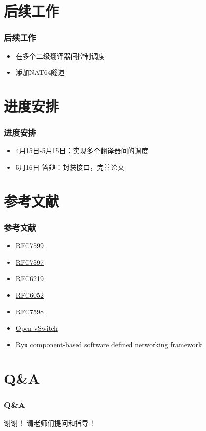 \documentclass{beamer}
\begin{document}
\section{后续工作}
\begin{frame}
  \frametitle{后续工作}

  \begin{block}{}
    \begin{itemize}
    \item 在多个二级翻译器间控制调度
    \item 添加NAT64隧道
    \end{itemize}
  \end{block}
\end{frame}

\section{进度安排}

\begin{frame}
  \frametitle{进度安排}
  \begin{block}{}
    \begin{itemize}
    \item 4月15日-5月15日：实现多个翻译器间的调度
    \item 5月16日-答辩：封装接口，完善论文
    \end{itemize}
  \end{block}
\end{frame}

\section{参考文献}
\begin{frame}
  \frametitle{参考文献}
  \begin{itemize}
  \item \href{https://tools.ietf.org/html/rfc7599}{RFC7599}
  \item \href{https://tools.ietf.org/html/rfc7597}{RFC7597}
  \item \href{https://tools.ietf.org/html/rfc6219}{RFC6219}
  \item \href{https://tools.ietf.org/html/rfc6052}{RFC6052}
  \item \href{https://tools.ietf.org/html/rfc7598}{RFC7598}
  \item
    \href{http://openvswitch.org/}{Open vSwitch}
  \item
    \href{http://osrg.github.io/ryu/}{Ryu component-based software defined networking framework }
  \end{itemize}
\end{frame}

\section{Q\&A}

\begin{frame}
  \frametitle{Q\&A}
  \begin{center}
    {\LARGE 谢谢！}
    \vspace{3em}
    {\LARGE 请老师们提问和指导！}
  \end{center}
\end{frame}
\end{document}
